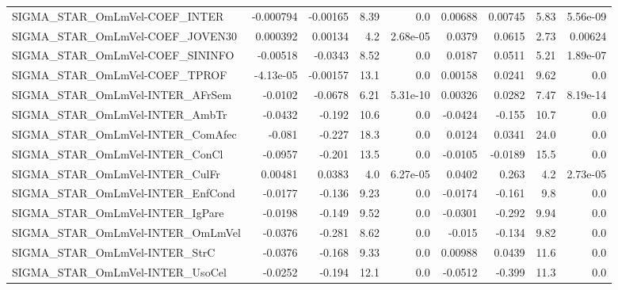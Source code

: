 \begin{tabular}{lrrrrrrrr}
SIGMA\_STAR\_OmLmVel-COEF\_INTER          &   -0.000794 &     -0.00165 &     8.39 &      0.0 &    0.00688 &     0.00745 &         5.83 &      5.56e-09 \\
SIGMA\_STAR\_OmLmVel-COEF\_JOVEN30        &    0.000392 &      0.00134 &      4.2 & 2.68e-05 &     0.0379 &      0.0615 &         2.73 &       0.00624 \\
SIGMA\_STAR\_OmLmVel-COEF\_SININFO        &    -0.00518 &      -0.0343 &     8.52 &      0.0 &     0.0187 &      0.0511 &         5.21 &      1.89e-07 \\
SIGMA\_STAR\_OmLmVel-COEF\_TPROF          &   -4.13e-05 &     -0.00157 &     13.1 &      0.0 &    0.00158 &      0.0241 &         9.62 &           0.0 \\
SIGMA\_STAR\_OmLmVel-INTER\_AFrSem        &     -0.0102 &      -0.0678 &     6.21 & 5.31e-10 &    0.00326 &      0.0282 &         7.47 &      8.19e-14 \\
SIGMA\_STAR\_OmLmVel-INTER\_AmbTr         &     -0.0432 &       -0.192 &     10.6 &      0.0 &    -0.0424 &      -0.155 &         10.7 &           0.0 \\
SIGMA\_STAR\_OmLmVel-INTER\_ComAfec       &      -0.081 &       -0.227 &     18.3 &      0.0 &     0.0124 &      0.0341 &         24.0 &           0.0 \\
SIGMA\_STAR\_OmLmVel-INTER\_ConCl         &     -0.0957 &       -0.201 &     13.5 &      0.0 &    -0.0105 &     -0.0189 &         15.5 &           0.0 \\
SIGMA\_STAR\_OmLmVel-INTER\_CulFr         &     0.00481 &       0.0383 &      4.0 & 6.27e-05 &     0.0402 &       0.263 &          4.2 &      2.73e-05 \\
SIGMA\_STAR\_OmLmVel-INTER\_EnfCond       &     -0.0177 &       -0.136 &     9.23 &      0.0 &    -0.0174 &      -0.161 &          9.8 &           0.0 \\
SIGMA\_STAR\_OmLmVel-INTER\_IgPare        &     -0.0198 &       -0.149 &     9.52 &      0.0 &    -0.0301 &      -0.292 &         9.94 &           0.0 \\
SIGMA\_STAR\_OmLmVel-INTER\_OmLmVel       &     -0.0376 &       -0.281 &     8.62 &      0.0 &     -0.015 &      -0.134 &         9.82 &           0.0 \\
SIGMA\_STAR\_OmLmVel-INTER\_StrC          &     -0.0376 &       -0.168 &     9.33 &      0.0 &    0.00988 &      0.0439 &         11.6 &           0.0 \\
SIGMA\_STAR\_OmLmVel-INTER\_UsoCel        &     -0.0252 &       -0.194 &     12.1 &      0.0 &    -0.0512 &      -0.399 &         11.3 &           0.0 \\

\end{tabular}
